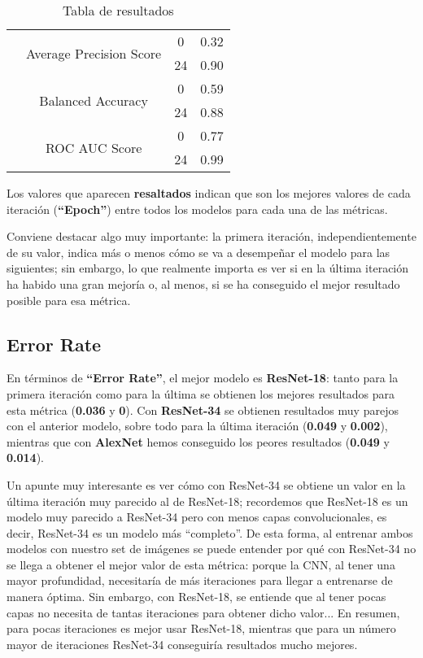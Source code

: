 \begin{table}[H]
{\begin{tabular}{|c|c|c|c|}
& \multirow{2}{3cm}{Average Precision Score} & 0 & 0.32 \\ \cline{3-4}
& & 24 & 0.90 \\ \cline{2-4}
& \multirow{2}{3cm}{Balanced Accuracy} & 0 & 0.59 \\ \cline{3-4}
& & 24 & 0.88 \\ \cline{2-4}
& \multirow{2}{3cm}{ROC AUC Score} & 0 & 0.77 \\ \cline{3-4}
& & 24 & 0.99 \\ \cline{1-4}
\end{tabular}}
\caption{Tabla de resultados} %
\label{tab:Resul_ISA2}
\end{table}

Los valores que aparecen \textbf{resaltados} indican que son los mejores valores de cada iteración (\textbf{``Epoch''}) entre todos los modelos para cada una de las métricas.

Conviene destacar algo muy importante: la primera iteración, independientemente de su valor, indica más o menos cómo se va a desempeñar el modelo para las siguientes; sin embargo, lo que realmente importa es ver si en la última iteración ha habido una gran mejoría o, al menos, si se ha conseguido el mejor resultado posible para esa métrica.

\subsection{Error Rate}

En términos de \textbf{``Error Rate''}, el mejor modelo es \textbf{ResNet-18}: tanto para la primera iteración como para la última se obtienen los mejores resultados para esta métrica (\textbf{0.036} y \textbf{0}). Con \textbf{ResNet-34} se obtienen resultados muy parejos con el anterior modelo, sobre todo para la última iteración (\textbf{0.049} y \textbf{0.002}), mientras que con \textbf{AlexNet} hemos conseguido los peores resultados (\textbf{0.049} y \textbf{0.014}).

Un apunte muy interesante es ver cómo con ResNet-34 se obtiene un valor en la última iteración muy parecido al de ResNet-18; recordemos que ResNet-18 es un modelo muy parecido a ResNet-34 pero con menos capas convolucionales, es decir, ResNet-34 es un modelo más ``completo''. De esta forma, al entrenar ambos modelos con nuestro set de imágenes se puede entender por qué con ResNet-34 no se llega a obtener el mejor valor de esta métrica: porque la \ac{CNN}, al tener una mayor profundidad, necesitaría de más iteraciones para llegar a entrenarse de manera óptima. Sin embargo, con ResNet-18, se entiende que al tener pocas capas no necesita de tantas iteraciones para obtener dicho valor... En resumen, para pocas iteraciones es mejor usar ResNet-18, mientras que para un número mayor de iteraciones ResNet-34 conseguiría resultados mucho mejores.

